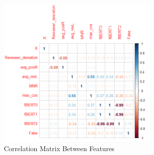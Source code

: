 \documentclass[man, floatsintext, 10pt]{apa6}
\begin{document}
\begin{figure}
\includegraphics[width=8cm]{corrplot.png}
\caption{Correlation Matrix Between Features}
\label{corr}
\end{figure}
\end{document}
